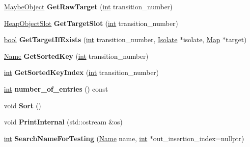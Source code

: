 \begin{DoxyCompactItemize}
\item 
\mbox{\label{classv8_1_1internal_1_1TransitionArray_a8fb8f1d318bd42b11c96374f3bf57b24}} 
\mbox{\hyperlink{classv8_1_1internal_1_1MaybeObject}{Maybe\+Object}} {\bfseries Get\+Raw\+Target} (\mbox{\hyperlink{classint}{int}} transition\+\_\+number)
\item 
\mbox{\label{classv8_1_1internal_1_1TransitionArray_ad0f99100fcdb59818af4ad5d54312653}} 
\mbox{\hyperlink{classv8_1_1internal_1_1HeapObjectSlot}{Heap\+Object\+Slot}} {\bfseries Get\+Target\+Slot} (\mbox{\hyperlink{classint}{int}} transition\+\_\+number)
\item 
\mbox{\label{classv8_1_1internal_1_1TransitionArray_ac4c86dd45e5ff5bf9169dcb777a62ae8}} 
\mbox{\hyperlink{classbool}{bool}} {\bfseries Get\+Target\+If\+Exists} (\mbox{\hyperlink{classint}{int}} transition\+\_\+number, \mbox{\hyperlink{classv8_1_1internal_1_1Isolate}{Isolate}} $\ast$isolate, \mbox{\hyperlink{classv8_1_1internal_1_1Map}{Map}} $\ast$target)
\item 
\mbox{\label{classv8_1_1internal_1_1TransitionArray_a5bd181f43429b1f2cca94098f7ca3657}} 
\mbox{\hyperlink{classv8_1_1internal_1_1Name}{Name}} {\bfseries Get\+Sorted\+Key} (\mbox{\hyperlink{classint}{int}} transition\+\_\+number)
\item 
\mbox{\label{classv8_1_1internal_1_1TransitionArray_a19f5f8e925dd62d56a4cb911ba71cdea}} 
\mbox{\hyperlink{classint}{int}} {\bfseries Get\+Sorted\+Key\+Index} (\mbox{\hyperlink{classint}{int}} transition\+\_\+number)
\item 
\mbox{\label{classv8_1_1internal_1_1TransitionArray_acc402e78fda2600babbeac9085d88731}} 
\mbox{\hyperlink{classint}{int}} {\bfseries number\+\_\+of\+\_\+entries} () const
\item 
\mbox{\label{classv8_1_1internal_1_1TransitionArray_a3e2a2bf44d81dc48bef530e0fc5bd09b}} 
void {\bfseries Sort} ()
\item 
\mbox{\label{classv8_1_1internal_1_1TransitionArray_ac4cfb20e659cf2cc24977a07fc12cefd}} 
void {\bfseries Print\+Internal} (std\+::ostream \&os)
\item 
\mbox{\label{classv8_1_1internal_1_1TransitionArray_ad4e24b1c3b86ea09ac107b8db28612e3}} 
\mbox{\hyperlink{classint}{int}} {\bfseries Search\+Name\+For\+Testing} (\mbox{\hyperlink{classv8_1_1internal_1_1Name}{Name}} name, \mbox{\hyperlink{classint}{int}} $\ast$out\+\_\+insertion\+\_\+index=nullptr)
\end{DoxyCompactItemize}
